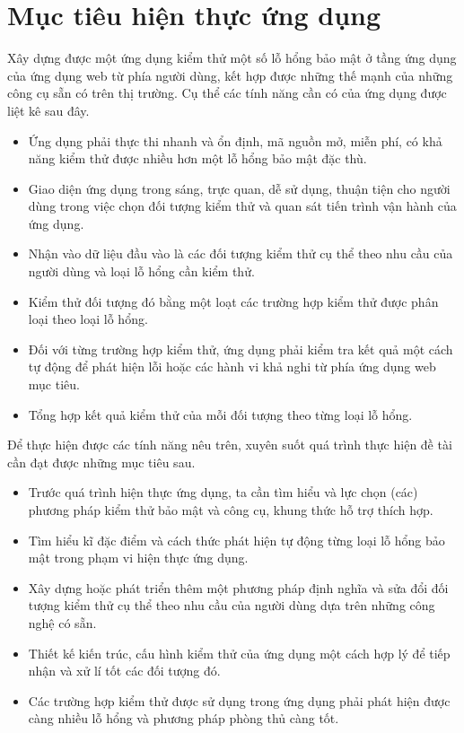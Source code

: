 \section{Mục tiêu hiện thực ứng dụng}
Xây dựng được một ứng dụng kiểm thử một số lỗ hổng bảo mật ở tầng ứng dụng của ứng dụng web từ phía người dùng, kết hợp được những thế mạnh của những công cụ sẵn có trên thị trường. Cụ thể các tính năng cần có của ứng dụng được liệt kê sau đây.
\begin{itemize}
    \item Ứng dụng phải thực thi nhanh và ổn định, mã nguồn mở, miễn phí, có khả năng kiểm thử được nhiều hơn một lỗ hổng bảo mật đặc thù.
    \item Giao diện ứng dụng trong sáng, trực quan, dễ sử dụng, thuận tiện cho người dùng trong việc chọn đối tượng kiểm thử và quan sát tiến trình vận hành của ứng dụng.
    \item Nhận vào dữ liệu đầu vào là các đối tượng kiểm thử cụ thể theo nhu cầu của người dùng và loại lỗ hổng cần kiểm thử.
    \item Kiểm thử đối tượng đó bằng một loạt các trường hợp kiểm thử được phân loại theo loại lỗ hổng.
    \item Đối với từng trường hợp kiểm thử, ứng dụng phải kiểm tra kết quả một cách tự động để phát hiện lỗi hoặc các hành vi khả nghi từ phía ứng dụng web mục tiêu.
    \item Tổng hợp kết quả kiểm thử của mỗi đối tượng theo từng loại lỗ hổng.
\end{itemize}
Để thực hiện được các tính năng nêu trên, xuyên suốt quá trình thực hiện đề tài cần đạt được những mục tiêu sau.
\begin{itemize}
    \item Trước quá trình hiện thực ứng dụng, ta cần tìm hiểu và lực chọn (các) phương pháp kiểm thử bảo mật và công cụ, khung thức hỗ trợ thích hợp.
    \item Tìm hiểu kĩ đặc điểm và cách thức phát hiện tự động từng loại lỗ hổng bảo mật trong phạm vi hiện thực ứng dụng.
    \item Xây dựng hoặc phát triển thêm một phương pháp định nghĩa và sửa đổi đối tượng kiểm thử cụ thể theo nhu cầu của người dùng dựa trên những công nghệ có sẵn.
    \item Thiết kế kiến trúc, cấu hình kiểm thử của ứng dụng một cách hợp lý để tiếp nhận và xử lí tốt các đối tượng đó.
    \item Các trường hợp kiểm thử được sử dụng trong ứng dụng phải phát hiện được càng nhiều lỗ hổng và phương pháp phòng thủ càng tốt.
\end{itemize}

